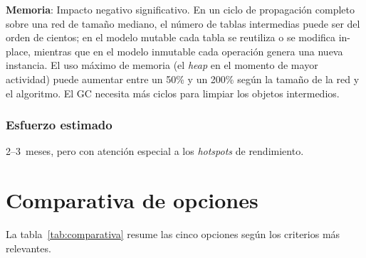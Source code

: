 \documentclass[11pt,a4paper]{article}
\begin{document}
\textbf{Memoria}: Impacto negativo significativo.  En un ciclo de propagación
completo sobre una red de tamaño mediano, el número de tablas intermedias puede
ser del orden de cientos; en el modelo mutable cada tabla se reutiliza o se modifica
in-place, mientras que en el modelo inmutable cada operación genera una nueva
instancia.  El uso máximo de memoria (el \emph{heap} en el momento de mayor
actividad) puede aumentar entre un 50\% y un 200\% según la tamaño de la red
y el algoritmo.  El GC necesita más ciclos para limpiar los objetos intermedios.

\subsubsection*{Esfuerzo estimado}

2--3~meses, pero con atención especial a los \emph{hotspots} de rendimiento.

\section{Comparativa de opciones}

La tabla~\ref{tab:comparativa} resume las cinco opciones según los criterios
más relevantes.
\end{document}
